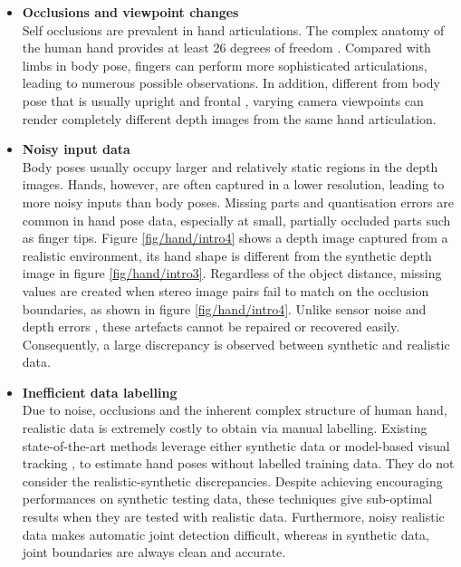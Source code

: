 \begin{itemize} 

\item{\textbf{Occlusions and viewpoint changes}} \\  
Self occlusions are prevalent in hand articulations. The complex anatomy of the human hand provides at least 26 degrees of freedom \cite{Rehg1995, Holden1995}. Compared with limbs in body pose, fingers can perform more sophisticated articulations, leading to numerous possible observations. In addition, different from body pose that is usually upright and frontal \cite{Eichner2012}, varying camera viewpoints can render completely different depth images from the same hand articulation. 

\item{\textbf{Noisy input data}} \\ 
Body poses usually occupy larger and relatively static regions in the depth images. 
Hands, however, are often captured in a lower resolution, leading to more noisy inputs than body poses. 
Missing parts and quantisation errors are common in hand pose data, especially at small, partially occluded parts such as finger tips. Figure \ref{fig/hand/intro4} shows a depth image captured from a realistic environment, its hand shape is different from the synthetic depth image in figure \ref{fig/hand/intro3}.   
Regardless of the object distance, missing values are created when stereo image pairs fail to match on the occlusion boundaries, as shown in figure \ref{fig/hand/intro4}. 
Unlike sensor noise and depth errors \cite{Girshick2011, Baak2011}, these artefacts cannot be repaired or recovered easily. Consequently, a large discrepancy is observed between synthetic and realistic data.  

\item{\textbf{Inefficient data labelling}} \\ 
Due to noise, occlusions and the inherent complex structure of human hand, realistic data is extremely costly to obtain via manual labelling. 
Existing state-of-the-art methods leverage either synthetic data \cite{Keskin2012} or model-based visual tracking \cite{LaGorce2011, Oikonomidis2012}, to estimate hand poses without labelled training data. 
They do not consider the realistic-synthetic discrepancies. 
Despite achieving encouraging performances on synthetic testing data, these techniques give sub-optimal results when they are tested with realistic data. 
Furthermore, noisy realistic data makes automatic joint detection difficult, whereas in synthetic data, joint boundaries are always clean and accurate.
\end{itemize} 

